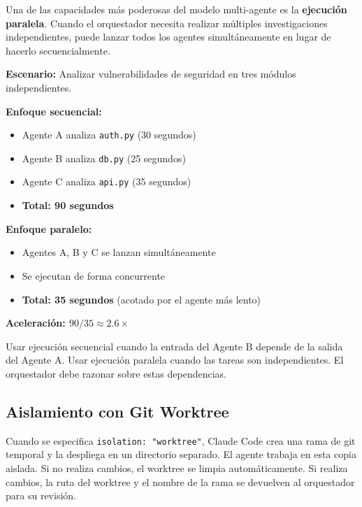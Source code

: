 \documentclass[11pt,letterpaper]{article}
\begin{document}
Una de las capacidades más poderosas del modelo multi-agente es la \textbf{ejecución paralela}. Cuando el orquestador necesita realizar múltiples investigaciones independientes, puede lanzar todos los agentes simultáneamente en lugar de hacerlo secuencialmente.

\begin{examplebox}[title=Ejecución Paralela vs. Secuencial de Agentes]
\textbf{Escenario:} Analizar vulnerabilidades de seguridad en tres módulos independientes.

\textbf{Enfoque secuencial:}
\begin{itemize}
    \item Agente A analiza \texttt{auth.py} (30 segundos)
    \item Agente B analiza \texttt{db.py} (25 segundos)
    \item Agente C analiza \texttt{api.py} (35 segundos)
    \item \textbf{Total: 90 segundos}
\end{itemize}

\textbf{Enfoque paralelo:}
\begin{itemize}
    \item Agentes A, B y C se lanzan simultáneamente
    \item Se ejecutan de forma concurrente
    \item \textbf{Total: 35 segundos} (acotado por el agente más lento)
\end{itemize}

\textbf{Aceleración: $90/35 \approx 2.6\times$}
\end{examplebox}

\begin{notebox}
Usar ejecución secuencial cuando la entrada del Agente B depende de la salida del Agente A. Usar ejecución paralela cuando las tareas son independientes. El orquestador debe razonar sobre estas dependencias.
\end{notebox}

\subsection{Aislamiento con Git Worktree}

Cuando se especifica \texttt{isolation: "worktree"}, Claude Code crea una rama de git temporal y la despliega en un directorio separado. El agente trabaja en esta copia aislada. Si no realiza cambios, el worktree se limpia automáticamente. Si realiza cambios, la ruta del worktree y el nombre de la rama se devuelven al orquestador para su revisión.
\end{document}
